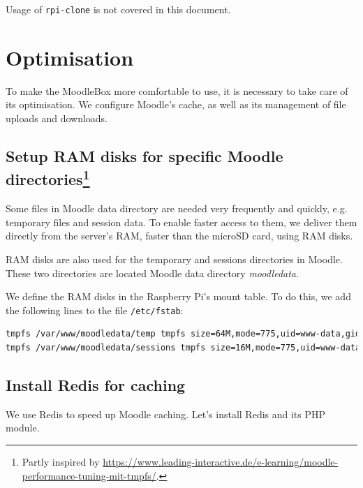 \documentclass[12pt]{article}
\begin{document}
Usage of \texttt{rpi-clone} is not covered in this document.

\section{Optimisation}\label{sec-optimisation}

To make the MoodleBox more comfortable to use, it is necessary to take care of its optimisation.
We configure Moodle's cache, as well as its management of file uploads and downloads.

\subsection[Setup RAM disks for specific Moodle directories]{Setup RAM disks for specific Moodle directories\footnote{Partly inspired by \url{https://www.leading-interactive.de/e-learning/moodle-performance-tuning-mit-tmpfs/}.}}

Some files in Moodle data directory are needed very frequently and quickly, e.g. temporary files and session data.
To enable faster access to them, we deliver them directly from the server's RAM, faster than the microSD card, using RAM disks.

RAM disks are also used for the temporary and sessions directories in Moodle.
These two directories are located Moodle data directory \emph{moodledata}.

We define the RAM disks in the Raspberry Pi's mount table.
To do this, we add the following lines to the file \lstinline{/etc/fstab}:
\begin{lstlisting}[language=bash]
tmpfs /var/www/moodledata/temp tmpfs size=64M,mode=775,uid=www-data,gid=www-data 0 0
tmpfs /var/www/moodledata/sessions tmpfs size=16M,mode=775,uid=www-data,gid=www-data 0 0
\end{lstlisting}

%
%

\subsection{Install Redis for caching}

We use Redis to speed up Moodle caching.
Let's install Redis and its PHP module.
\end{document}
